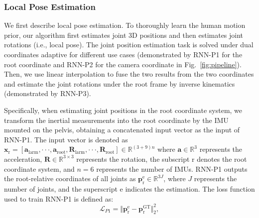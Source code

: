 \subsubsection{Local Pose Estimation}\label{subsubsec:Pose}
We first describe local pose estimation.
%
To thoroughly learn the human motion prior, our algorithm first estimates joint 3D positions and then estimates joint rotations (i.e., local pose).
%
The joint position estimation task is solved under dual coordinates adaptive for different use cases (demonstrated by RNN-P1 for the root coordinate and RNN-P2 for the camera coordinate in Fig.~\ref{fig:pipeline}).
%
Then, we use linear interpolation to fuse the two results from the two coordinates and estimate the joint rotations under the root frame by inverse kinematics (demonstrated by RNN-P3).
%
\par
Specifically, when estimating joint positions in the root coordinate system, we transform the inertial measurements into the root coordinate by the IMU mounted on the pelvis, obtaining a concatenated input vector as the input of RNN-P1.
%
The input vector is denoted as $\boldsymbol{x}_{\mathrm{r}}=\left[\boldsymbol{a}_{\mathrm{larm}},\cdot\cdot\cdot,\boldsymbol{a}_{\mathrm{root}},\boldsymbol{R}_{\mathrm{larm}},\cdot\cdot\cdot,\boldsymbol{R}_{\mathrm{root}}\right]\in\mathbb{R}^{(3+9)n}$ where $\boldsymbol{a}\in\mathbb{R}^3$ represents the acceleration, $\boldsymbol{R}\in\mathbb{R}^{3\times3}$ represents the rotation, the subscript $\mathrm{r}$ denotes the root coordinate system, and $n=6$ represents the number of IMUs.
%
RNN-P1 outputs the root-relative coordinates of all joints as $\boldsymbol{p}_{\mathrm{r}}^{\mathrm{e}}\in\mathbb{R}^{3J}$, where $J$ represents the number of joints, and the superscript $\mathrm{e}$ indicates the estimation.
%
The loss function used to train  RNN-P1 is defined as:
\begin{equation}
    \mathcal{L}_{P1}=\Vert \boldsymbol{p}_{\mathrm{r}}^{\mathrm{e}}-\boldsymbol{p}_\mathrm{r}^{\mathrm{GT}} \Vert_2^{2},
\end{equation}
